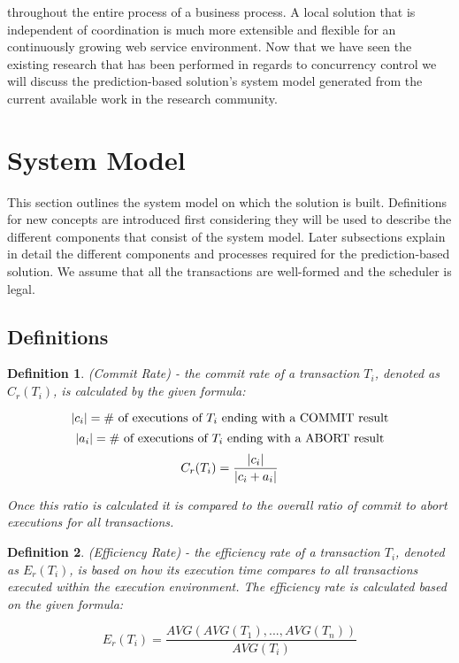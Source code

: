 \documentclass[conference]{IEEEtran}
\newtheorem{definition}{Definition}
\DeclarePairedDelimiter\abs{\lvert}{\rvert}%
\begin{document}
throughout the entire process of a business process. A local solution that is independent of coordination is much more extensible and flexible for an continuously growing web service environment. Now that we have seen the existing research that has been performed in regards to concurrency control we will discuss the prediction-based solution's system model generated from the current available work in the research community.

\section{System Model}
\label{sec:system_model}
This section outlines the system model on which the solution is built. Definitions for new concepts are introduced first considering they will be used to describe the different components that consist of the system model. Later subsections explain in detail the different components and processes required for the prediction-based solution. We assume that all the transactions are well-formed and the scheduler is legal.

\subsection{Definitions}
\label{definitions}

\begin{definition}
\label{cmt_rate}
 (Commit Rate) - the commit rate of a transaction $T_{i}$, denoted as  $C_{r}(T_{i})$, is calculated by the given formula:
 
 \[\textrm{$\abs{c_{i}}$} = \textrm{\# of executions of $T_{i}$ ending with a COMMIT result}\]
 \[\textrm{$\abs{a_{i}}$} = \textrm{\# of executions of $T_{i}$ ending with a ABORT result}\]
 \[\textrm{$C_{r}(T_{i})$} =\frac{\textrm{$\abs{c_{i}}$}}{\textrm{$\abs{c_{i} + a_{i}}$}}\]
 
 Once this ratio is calculated it is compared to the overall ratio of commit to abort executions for all transactions.
 
\end{definition}

\begin{definition}
\label{eff_rate}
 (Efficiency Rate) - the efficiency rate of a transaction $T_{i}$, denoted as  $E_{r}(T_{i})$, is based on how its execution time compares to all transactions executed within the execution environment. The efficiency rate is calculated based on the given formula:
 
\[\textrm{$E_{r}(T_{i})$} =\frac{\textrm{$AVG(AVG(T_{1}),...,AVG(T_{n}))$}}{\textrm{$AVG(T_{i})$}}\]
 
\end{definition}
\end{document}
